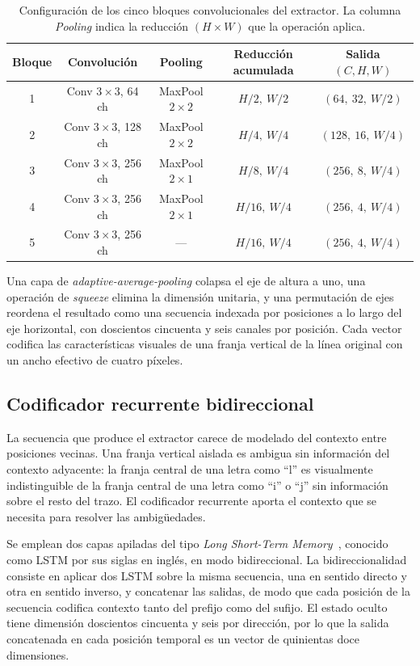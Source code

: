 \begin{table}[!htbp]
	\centering
	\caption{Configuración de los cinco bloques convolucionales del extractor. La columna \emph{Pooling} indica la reducción $(H \times W)$ que la operación aplica.}
	\label{tab:bloques-cnn}
	\footnotesize
	\begin{tabular}{ccccc}
		\toprule
		\textbf{Bloque} & \textbf{Convolución} & \textbf{Pooling} & \textbf{Reducción acumulada} & \textbf{Salida $(C, H, W)$} \\
		\midrule
		1 & Conv $3\times3$, 64 ch  & MaxPool $2\times2$ & $H/2,\ W/2$ & $(64,\ 32,\ W/2)$ \\
		2 & Conv $3\times3$, 128 ch & MaxPool $2\times2$ & $H/4,\ W/4$ & $(128,\ 16,\ W/4)$ \\
		3 & Conv $3\times3$, 256 ch & MaxPool $2\times1$ & $H/8,\ W/4$ & $(256,\ 8,\ W/4)$ \\
		4 & Conv $3\times3$, 256 ch & MaxPool $2\times1$ & $H/16,\ W/4$ & $(256,\ 4,\ W/4)$ \\
		5 & Conv $3\times3$, 256 ch & ---                & $H/16,\ W/4$ & $(256,\ 4,\ W/4)$ \\
		\bottomrule
	\end{tabular}
\end{table}

Una capa de \textit{adaptive-average-pooling} colapsa el eje de altura a uno, una operación de \textit{squeeze} elimina la dimensión unitaria, y una permutación de ejes reordena el resultado como una secuencia indexada por posiciones a lo largo del eje horizontal, con doscientos cincuenta y seis canales por posición. Cada vector codifica las características visuales de una franja vertical de la línea original con un ancho efectivo de cuatro píxeles.

\subsection{Codificador recurrente bidireccional}
\label{subsec:rnn-secuencial}

La secuencia que produce el extractor carece de modelado del contexto entre posiciones vecinas. Una franja vertical aislada es ambigua sin información del contexto adyacente: la franja central de una letra como ``l'' es visualmente indistinguible de la franja central de una letra como ``i'' o ``j'' sin información sobre el resto del trazo. El codificador recurrente aporta el contexto que se necesita para resolver las ambigüedades.

Se emplean dos capas apiladas del tipo \textit{Long Short-Term Memory}~\cite{hochreiter1997lstm}, conocido como LSTM por sus siglas en inglés, en modo bidireccional. La bidireccionalidad consiste en aplicar dos LSTM sobre la misma secuencia, una en sentido directo y otra en sentido inverso, y concatenar las salidas, de modo que cada posición de la secuencia codifica contexto tanto del prefijo como del sufijo. El estado oculto tiene dimensión doscientos cincuenta y seis por dirección, por lo que la salida concatenada en cada posición temporal es un vector de quinientas doce dimensiones.

